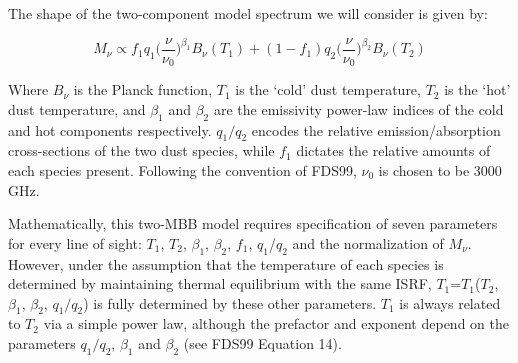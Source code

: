 \documentclass{emulateapj}
\begin{document}



The shape of the two-component model spectrum we will consider is given by:

\begin{equation}
M_{\nu} \propto f_{1}q_{1}\Big(\frac{\nu}{\nu_{0}}\Big)^{\beta_1}B_{\nu}(T_1) + (1-f_{1})q_{2}\Big(\frac{\nu}{\nu_0}\Big)^{\beta_2}B_{\nu}(T_2)
\end{equation}

 


Where $B_{\nu}$ is the Planck function, $T_1$ is the `cold' dust temperature, 
$T_2$ is the `hot' dust temperature, and $\beta_1$ and $\beta_2$ are the
emissivity power-law indices of the cold and hot components respectively. 
$q_1/q_2$ encodes the relative emission/absorption cross-sections of the two 
dust species, while $f_1$ dictates the relative amounts of each species 
present. Following the convention of FDS99, $\nu_0$ is chosen to be 3000 GHz. 

Mathematically, this two-MBB model requires specification of seven 
parameters for every line of sight: $T_1$, $T_2$, $\beta_1$, $\beta_2$, $f_1$, 
$q_1$/$q_2$ and the normalization of $M_{\nu}$. However, under the 
assumption that the temperature of each species is determined by maintaining 
thermal equilibrium with the same ISRF, $T_1$=$T_1$($T_2$, $\beta_1$, 
$\beta_2$, $q_1/q_2$) is fully determined by these other parameters. $T_1$ is 
always related to $T_2$ via a simple power law, although the prefactor and 
exponent depend on the parameters $q_1/q_2$, $\beta_1$ and $\beta_2$ (see FDS99
Equation 14).
\end{document}
